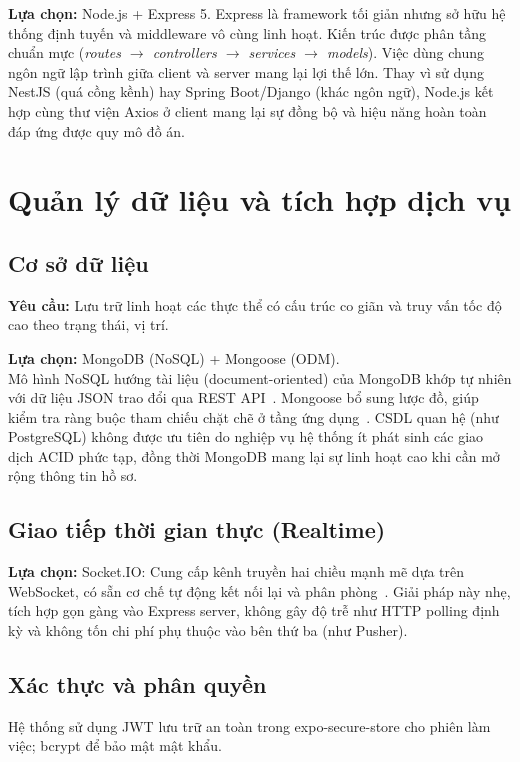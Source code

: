 \documentclass[../main.tex]{subfiles}%
\begin{document}
\textbf{Lựa chọn:} Node.js + Express 5.
Express là framework tối giản nhưng sở hữu hệ thống định tuyến và middleware vô cùng linh hoạt. Kiến trúc được phân tầng chuẩn mực (\textit{routes $\rightarrow$ controllers $\rightarrow$ services $\rightarrow$ models}). Việc dùng chung ngôn ngữ lập trình giữa client và server mang lại lợi thế lớn. Thay vì sử dụng NestJS (quá cồng kềnh) hay Spring Boot/Django (khác ngôn ngữ), Node.js kết hợp cùng thư viện Axios ở client mang lại sự đồng bộ và hiệu năng hoàn toàn đáp ứng được quy mô đồ án.

\section{Quản lý dữ liệu và tích hợp dịch vụ}

\subsection{Cơ sở dữ liệu}
\textbf{Yêu cầu:} Lưu trữ linh hoạt các thực thể có cấu trúc co giãn và truy vấn tốc độ cao theo trạng thái, vị trí.

\textbf{Lựa chọn:} MongoDB (NoSQL) + Mongoose (ODM).\\
Mô hình NoSQL hướng tài liệu (document-oriented) của MongoDB khớp tự nhiên với dữ liệu JSON trao đổi qua REST API~\cite{MongoDBDocs}. Mongoose bổ sung lược đồ, giúp kiểm tra ràng buộc tham chiếu chặt chẽ ở tầng ứng dụng~\cite{MongooseDocs}. CSDL quan hệ (như PostgreSQL) không được ưu tiên do nghiệp vụ hệ thống ít phát sinh các giao dịch ACID phức tạp, đồng thời MongoDB mang lại sự linh hoạt cao khi cần mở rộng thông tin hồ sơ.

\subsection{Giao tiếp thời gian thực (Realtime)}
\textbf{Lựa chọn:} Socket.IO: Cung cấp kênh truyền hai chiều mạnh mẽ dựa trên WebSocket, có sẵn cơ chế tự động kết nối lại và phân phòng~\cite{SocketIODocs}. Giải pháp này nhẹ, tích hợp gọn gàng vào Express server, không gây độ trễ như HTTP polling định kỳ và không tốn chi phí phụ thuộc vào bên thứ ba (như Pusher).

\subsection{Xác thực và phân quyền}
Hệ thống sử dụng JWT lưu trữ an toàn trong expo-secure-store cho phiên làm việc; bcrypt để bảo mật mật khẩu.
\end{document}
